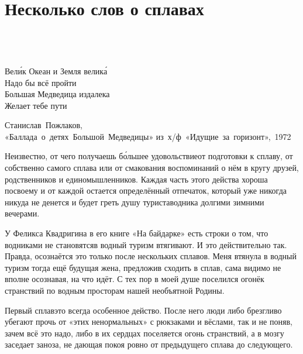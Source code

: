 \chapter{Несколько слов о сплавах} 

\epigraph{%
	~\\
	~\\	
	~\\	
	Вел\'{и}к Океан и Земля велик\'{а} \\
	Надо бы всё пройти \\
	Большая Медведица издалека \\
	Желает тебе пути}
	{
	\begin{flushright}
		\small{Станислав~Пожлаков,\\«Баллада~о~детях~Большой~Медведицы» из~х/ф~«Идущие~за~горизонт»,~1972}
	\end{flushright}
	}

Неизвестно, от чего получаешь б\'{о}льшее удовольствие\mdash от подготовки к сплаву, от собственно самого сплава или от смакования воспоминаний о нём в кругу друзей, родственников и единомышленников. Каждая часть этого действа хороша по\sdash своему и от каждой остается определённый отпечаток, который уже никогда никуда не денется и будет греть душу туриста\sdash водника долгими зимними вечерами.

У Феликса Квадригина в его книге «На байдарке» \cite{Квадригин} есть строки о том, что водниками не становятся\mdash в водный туризм втягивают. И это действительно так. Правда, осознаётся это только после нескольких сплавов. Меня втянула в водный туризм тогда ещё будущая жена, предложив сходить в сплав, сама видимо не вполне осознавая, на что идёт. С тех пор в моей душе поселился огонёк странствий по водным просторам нашей необъятной Родины.

Первый сплав\mdash это всегда особенное действо. После него люди либо брезгливо убегают прочь от «этих ненормальных» с рюкзаками и вёслами, так и не поняв, зачем всё это надо, либо в их сердцах поселяется огонь странствий, а в мозгу заседает заноза, не дающая покоя ровно от предыдущего сплава до следующего. 

